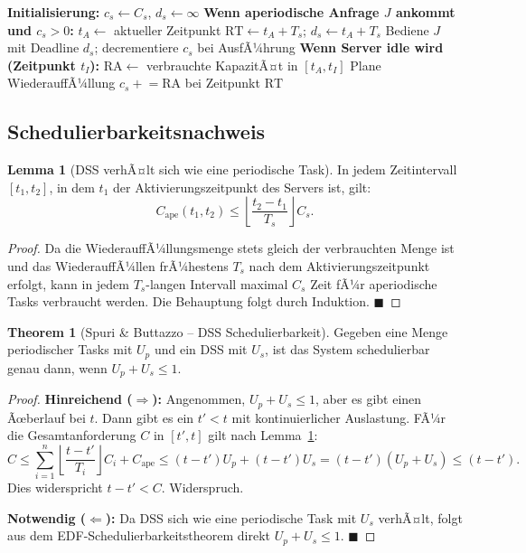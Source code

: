 ﻿\documentclass[a4paper,12pt]{report}
\theoremstyle{definition}
\newtheorem{lemma}{Lemma}[chapter]
\newtheorem{theorem}{Theorem}[chapter]
\begin{document}
\begin{algorithm}[H]
	\caption{DSS Server -- KapazitÃ¤tsverwaltung}
	\begin{algorithmic}[1]
		\State \textbf{Initialisierung:} $c_s \leftarrow C_s$, $d_s \leftarrow \infty$
		\State
		\State \textbf{Wenn aperiodische Anfrage $J$ ankommt und $c_s > 0$:}
		\State $t_A \leftarrow$ aktueller Zeitpunkt
		\State $\mathrm{RT} \leftarrow t_A + T_s$; $d_s \leftarrow t_A + T_s$
		\State Bediene $J$ mit Deadline $d_s$; decrementiere $c_s$ bei AusfÃ¼hrung
		\State
		\State \textbf{Wenn Server idle wird (Zeitpunkt $t_I$):}
		\State $\mathrm{RA} \leftarrow$ verbrauchte KapazitÃ¤t in $[t_A, t_I]$
		\State Plane WiederauffÃ¼llung $c_s \mathrel{+}= \mathrm{RA}$ bei Zeitpunkt $\mathrm{RT}$
	\end{algorithmic}
\end{algorithm}

\subsection{Schedulierbarkeitsnachweis}

\begin{lemma}[DSS verhÃ¤lt sich wie eine periodische Task]
	\label{lem:dss_periodic}
	In jedem Zeitintervall $[t_1, t_2]$, in dem $t_1$ der Aktivierungszeitpunkt
	des Servers ist, gilt:
	\[
		C_{\mathrm{ape}}(t_1, t_2) \leq \left\lfloor \frac{t_2 - t_1}{T_s} \right\rfloor C_s.
	\]
\end{lemma}

\begin{proof}
	Da die WiederauffÃ¼llungsmenge stets gleich der verbrauchten Menge ist und
	das WiederauffÃ¼llen frÃ¼hestens $T_s$ nach dem Aktivierungszeitpunkt erfolgt,
	kann in jedem $T_s$-langen Intervall maximal $C_s$ Zeit fÃ¼r aperiodische
	Tasks verbraucht werden. Die Behauptung folgt durch Induktion. \hfill$\blacksquare$
\end{proof}

\begin{theorem}[Spuri \& Buttazzo -- DSS Schedulierbarkeit]
	\label{thm:dss}
	Gegeben eine Menge periodischer Tasks mit $U_p$ und ein DSS mit $U_s$, ist
	das System schedulierbar genau dann, wenn $U_p + U_s \leq 1$.
\end{theorem}

\begin{proof}
	\textbf{Hinreichend ($\Rightarrow$):} Angenommen, $U_p + U_s \leq 1$, aber
	es gibt einen Ãœberlauf bei $t$. Dann gibt es ein $t' < t$ mit kontinuierlicher
	Auslastung. FÃ¼r die Gesamtanforderung $C$ in $[t', t]$ gilt nach
	Lemma~\ref{lem:dss_periodic}:
	\[
		C \leq \sum_{i=1}^n \left\lfloor \frac{t-t'}{T_i} \right\rfloor C_i + C_{\mathrm{ape}}
		\leq (t-t') U_p + (t-t') U_s = (t-t')(U_p+U_s) \leq (t-t').
	\]
	Dies widerspricht $t-t' < C$. Widerspruch.

	\textbf{Notwendig ($\Leftarrow$):} Da DSS sich wie eine periodische Task mit
	$U_s$ verhÃ¤lt, folgt aus dem EDF-Schedulierbarkeitstheorem direkt $U_p + U_s \leq 1$. \hfill$\blacksquare$
\end{proof}
\end{document}
